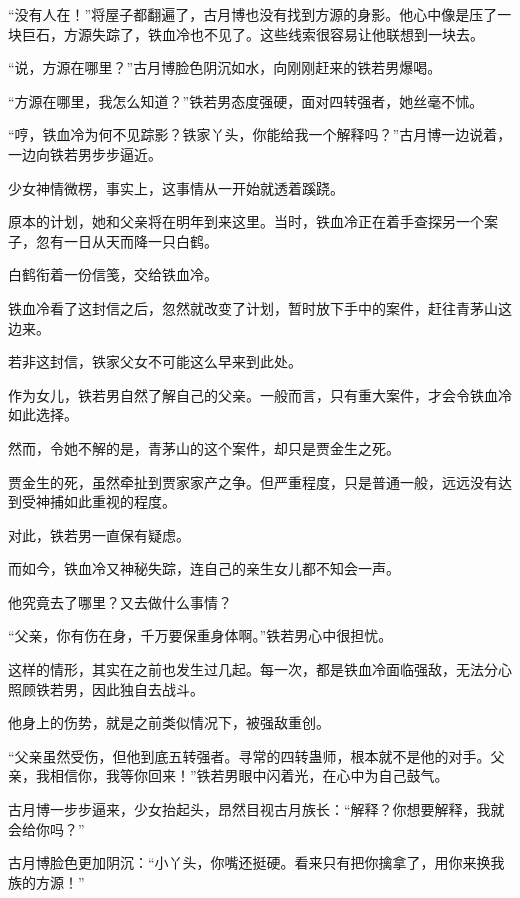 
\begin{this_body}

“没有人在！”将屋子都翻遍了，古月博也没有找到方源的身影。他心中像是压了一块巨石，方源失踪了，铁血冷也不见了。这些线索很容易让他联想到一块去。

“说，方源在哪里？”古月博脸色阴沉如水，向刚刚赶来的铁若男爆喝。

“方源在哪里，我怎么知道？”铁若男态度强硬，面对四转强者，她丝毫不怵。

“哼，铁血冷为何不见踪影？铁家丫头，你能给我一个解释吗？”古月博一边说着，一边向铁若男步步逼近。

少女神情微楞，事实上，这事情从一开始就透着蹊跷。

原本的计划，她和父亲将在明年到来这里。当时，铁血冷正在着手查探另一个案子，忽有一日从天而降一只白鹤。

白鹤衔着一份信笺，交给铁血冷。

铁血冷看了这封信之后，忽然就改变了计划，暂时放下手中的案件，赶往青茅山这边来。

若非这封信，铁家父女不可能这么早来到此处。

作为女儿，铁若男自然了解自己的父亲。一般而言，只有重大案件，才会令铁血冷如此选择。

然而，令她不解的是，青茅山的这个案件，却只是贾金生之死。

贾金生的死，虽然牵扯到贾家家产之争。但严重程度，只是普通一般，远远没有达到受神捕如此重视的程度。

对此，铁若男一直保有疑虑。

而如今，铁血冷又神秘失踪，连自己的亲生女儿都不知会一声。

他究竟去了哪里？又去做什么事情？

“父亲，你有伤在身，千万要保重身体啊。”铁若男心中很担忧。

这样的情形，其实在之前也发生过几起。每一次，都是铁血冷面临强敌，无法分心照顾铁若男，因此独自去战斗。

他身上的伤势，就是之前类似情况下，被强敌重创。

“父亲虽然受伤，但他到底五转强者。寻常的四转蛊师，根本就不是他的对手。父亲，我相信你，我等你回来！”铁若男眼中闪着光，在心中为自己鼓气。

古月博一步步逼来，少女抬起头，昂然目视古月族长：“解释？你想要解释，我就会给你吗？”

古月博脸色更加阴沉：“小丫头，你嘴还挺硬。看来只有把你擒拿了，用你来换我族的方源！”


\end{this_body}
